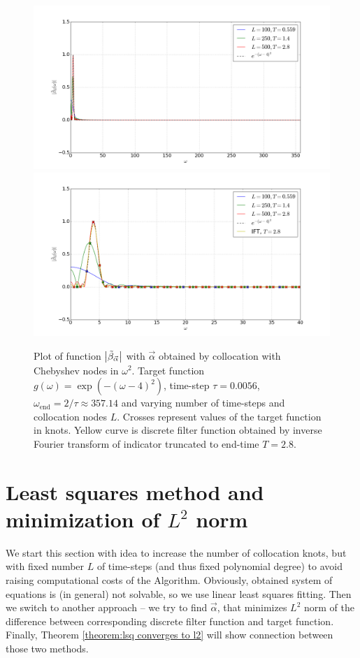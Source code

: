 \documentclass[a4paper,11pt,bibliography=totoc,listof=totoc,headinclude=true,cleardoublepage=empty,oneside]{scrbook}
\newcommand{\dffv}{\Tilde{\beta}_{\Vec{\alpha}}}
\newcommand{\e}{\mathrm{end}}
\begin{document}
\begin{figure} %
    \centering
    \includegraphics[width=1\linewidth]{latex//images//cheb_coll/Figure_5.png}
    \includegraphics[width=1\linewidth]{latex//images//cheb_coll/Figure_6.png}
    \caption{Plot of function $\left|\dffv\right|$ with $\Vec{\alpha}$ obtained by collocation with Chebyshev nodes in $\omega^2$. Target function $g(\omega) = \exp\left(-(\omega-4)^2\right)$, time-step $\tau = 0.0056$, $\omega_\e = 2/\tau \approx 357.14$ and varying number of time-steps and collocation nodes $L$. Crosses represent values of the target function in knots. Yellow curve is discrete filter function obtained by inverse Fourier transform of indicator truncated to end-time $T=2.8$.}
    \label{fig:cheb coll cont ex}
\end{figure}

\section{Least squares method and minimization of $L^2$ norm}
We start this section with idea to increase the number of collocation knots, but with fixed number $L$ of time-steps (and thus fixed polynomial degree) to avoid raising computational costs of the Algorithm. Obviously, obtained system of equations is (in general) not solvable, so we use linear least squares fitting. Then we switch to another approach -- we try to find $\Vec{\alpha}$, that minimizes $L^2$ norm of the difference between corresponding discrete filter function and target function. Finally, Theorem \ref{theorem:lsq converges to l2} will show connection between those two methods.
\end{document}
